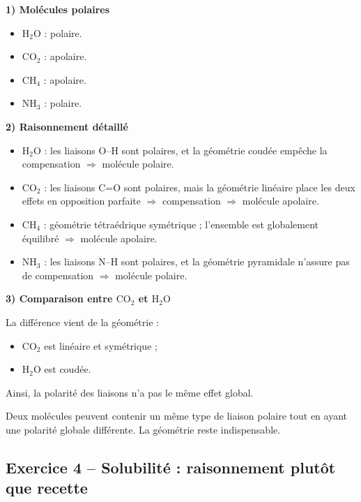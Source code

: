 \documentclass[11pt,a4paper]{article}
\begin{document}
\begin{corrigebox}
\textbf{1) Molécules polaires}

\begin{itemize}
    \item \(\mathrm{H_2O}\) : polaire.
    \item \(\mathrm{CO_2}\) : apolaire.
    \item \(\mathrm{CH_4}\) : apolaire.
    \item \(\mathrm{NH_3}\) : polaire.
\end{itemize}

\textbf{2) Raisonnement détaillé}

\begin{itemize}
    \item \(\mathrm{H_2O}\) : les liaisons O--H sont polaires, et la géométrie coudée empêche la compensation \(\Rightarrow\) molécule polaire.
    \item \(\mathrm{CO_2}\) : les liaisons C=O sont polaires, mais la géométrie linéaire place les deux effets en opposition parfaite \(\Rightarrow\) compensation \(\Rightarrow\) molécule apolaire.
    \item \(\mathrm{CH_4}\) : géométrie tétraédrique symétrique ; l'ensemble est globalement équilibré \(\Rightarrow\) molécule apolaire.
    \item \(\mathrm{NH_3}\) : les liaisons N--H sont polaires, et la géométrie pyramidale n'assure pas de compensation \(\Rightarrow\) molécule polaire.
\end{itemize}

\textbf{3) Comparaison entre \(\mathrm{CO_2}\) et \(\mathrm{H_2O}\)}

La différence vient de la géométrie :
\begin{itemize}
    \item \(\mathrm{CO_2}\) est linéaire et symétrique ;
    \item \(\mathrm{H_2O}\) est coudée.
\end{itemize}
Ainsi, la polarité des liaisons n'a pas le même effet global.

\begin{attentionbox}
Deux molécules peuvent contenir un même type de liaison polaire tout en ayant une polarité globale différente.  
La géométrie reste indispensable.
\end{attentionbox}
\end{corrigebox}

\subsection{Exercice 4 -- Solubilité : raisonnement plutôt que recette}
\end{document}
